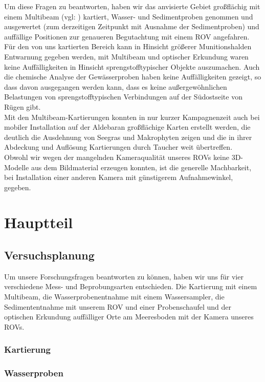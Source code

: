\documentclass[12pt,titlepage]{scrreprt}
\begin{document}
Um diese Fragen zu beantworten, haben wir das anvisierte Gebiet großflächig mit einem Multibeam (vgl: \cite{multib}) kartiert, Wasser- und Sedimentproben genommen und ausgewertet (zum derzeitigen Zeitpunkt mit Ausnahme der Sedimentproben) und auffällige Positionen zur genaueren Begutachtung mit einem ROV angefahren.\\
Für den von uns kartierten Bereich kann in Hinsicht größerer Munitionshalden Entwarnung gegeben werden, mit Multibeam und optischer Erkundung waren keine Auffälligkeiten in Hinsicht sprengstofftypischer Objekte auszumachen. Auch die chemische Analyse der Gewässerproben haben keine Auffälligkeiten gezeigt, so dass davon ausgegangen werden kann, dass es keine außergewöhnlichen Belastungen von sprengstofftypischen Verbindungen auf der Südostseite von Rügen gibt.\\
Mit den Multibeam-Kartierungen konnten in nur kurzer Kampagnenzeit auch bei mobiler Installation auf der Aldebaran großflächige Karten erstellt werden, die deutlich die Ausdehnung von Seegras und Makrophyten zeigen und die in ihrer Abdeckung und Auflösung Kartierungen durch Taucher weit übertreffen. \\
Obwohl wir wegen der mangelnden Kameraqualität unseres ROVs keine 3D-Modelle aus dem Bildmaterial erzeugen konnten, ist die generelle Machbarkeit, bei Installation einer anderen Kamera mit günstigerem Aufnahmewinkel, gegeben.

\tableofcontents

\chapter{Hauptteil}
\section{Versuchsplanung}
Um unsere Forschungsfragen beantworten zu können, haben wir uns für vier verschiedene Mess- und Beprobungsarten entschieden. Die Kartierung mit einem Multibeam, die Wasserprobenentnahme mit einem Wassersampler, die Sedimententnahme mit unserem ROV und einer Probenschaufel und der optischen Erkundung auffälliger Orte am Meeresboden mit der Kamera unseres ROVs.
\subsection{Kartierung}

\subsection{Wasserproben}

\end{document}
